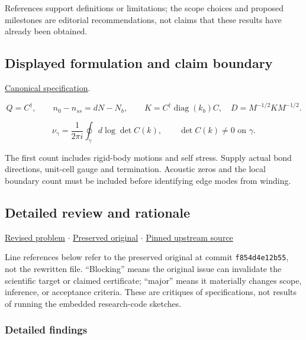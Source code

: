 \documentclass[
  11pt,
]{article}
\begin{document}
References support definitions or limitations; the scope choices and
proposed milestones are editorial recommendations, not claims that these
results have already been obtained.

\subsection{Displayed formulation and claim boundary}

\href{https://github.com/rick-stevens-ai/Pure-Thought/blob/main/PRDs/12-Topological-Mechanical-Metamaterials.md}{Canonical
specification}.

\[Q=C^\dagger,\qquad n_0-n_{ss}=dN-N_b,\qquad
K=C^\dagger\operatorname{diag}(k_b)C,\quad D=M^{-1/2}KM^{-1/2}.\]

\[\nu_\gamma=\frac1{2\pi i}\oint_\gamma d\log\det C(k),
\qquad \det C(k)\ne0\text{ on }\gamma.\]

The first count includes rigid-body motions and self stress. Supply
actual bond directions, unit-cell gauge and termination. Acoustic zeros
and the local boundary count must be included before identifying edge
modes from winding.

\subsection{Detailed review and rationale}

\href{https://github.com/rick-stevens-ai/Pure-Thought/blob/main/PRDs/12-Topological-Mechanical-Metamaterials.md}{Revised
problem} \ensuremath{\cdot}
\href{https://github.com/rick-stevens-ai/Pure-Thought/blob/main/archive/original-PRDs/12-Topological-Mechanical-Metamaterials.md}{Preserved
original} \ensuremath{\cdot}
\href{https://github.com/rick-stevens-ai/Pure-Thought/blob/f854d4e12b55c1f5b5c2a964b75f2d23496d981e/PRDs/12-Topological-Mechanical-Metamaterials.md}{Pinned
upstream source}

Line references below refer to the preserved original at commit
\texttt{f854d4e12b55}, not the rewritten file. ``Blocking'' means the
original issue can invalidate the scientific target or claimed
certificate; ``major'' means it materially changes scope, inference, or
acceptance criteria. These are critiques of specifications, not results
of running the embedded research-code sketches.

\subsubsection{Detailed findings}
\end{document}
